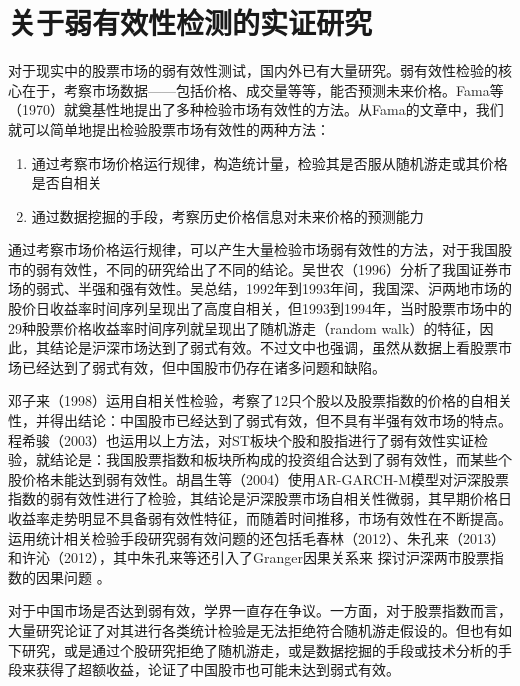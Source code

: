 \documentclass[twoside,longtitle]{LZUthesis}
\begin{document}
\section{关于弱有效性检测的实证研究}
对于现实中的股票市场的弱有效性测试，国内外已有大量研究。弱有效性检验的核心在于，考察市场数据——包括价格、成交量等等，能否预测未来价格。Fama等（1970）就奠基性地提出了多种检验市场有效性的方法\cite{Malkiel1970EFFICIENT}。从Fama的文章中，我们就可以简单地提出检验股票市场有效性的两种方法：
\begin{enumerate}
    \item 通过考察市场价格运行规律，构造统计量，检验其是否服从随机游走或其价格是否自相关
    \item 通过数据挖掘的手段，考察历史价格信息对未来价格的预测能力
\end{enumerate}

通过考察市场价格运行规律，可以产生大量检验市场弱有效性的方法，对于我国股市的弱有效性，不同的研究给出了不同的结论。吴世农（1996）分析了我国证券市场的弱式、半强和强有效性\cite{吴世农1996我国证券市场效率的分析}。吴总结，1992年到1993年间，我国深、沪两地市场的股价日收益率时间序列呈现出了高度自相关，但1993到1994年，当时股票市场中的29种股票价格收益率时间序列就呈现出了随机游走（random walk）的特征，因此，其结论是沪深市场达到了弱式有效。不过文中也强调，虽然从数据上看股票市场已经达到了弱式有效，但中国股市仍存在诸多问题和缺陷。

邓子来（1998）运用自相关性检验，考察了12只个股以及股票指数的价格的自相关性，并得出结论：中国股市已经达到了弱式有效，但不具有半强有效市场的特点\cite{邓子来市场有效理论及我国股票市场有效性的实证检验}。程希骏（2003）也运用以上方法，对ST板块个股和股指进行了弱有效性实证检验，就结论是：我国股票指数和板块所构成的投资组合达到了弱有效性，而某些个股价格未能达到弱有效性\cite{程希骏2003中国股市}。胡昌生等（2004）使用AR-GARCH-M模型对沪深股票指数的弱有效性进行了检验\cite{胡昌生2004中国股票市场有效性实证研究}，其结论是沪深股票市场自相关性微弱，其早期价格日收益率走势明显不具备弱有效性特征，而随着时间推移，市场有效性在不断提高。运用统计相关检验手段研究弱有效问题的还包括毛春林（2012）、朱孔来（2013）和许沁（2012），其中朱孔来等还引入了Granger因果关系来
探讨沪深两市股票指数的因果问题
\cite{毛春林2012有效市场理论与我国股票市场有效性分析}
\cite{朱孔来2013中国股票市场有效性的复合评价}
\cite{许沁2012中国股票市场弱有效性检验}。

对于中国市场是否达到弱有效，学界一直存在争议。一方面，对于股票指数而言，大量研究论证了对其进行各类统计检验是无法拒绝符合随机游走假设的。但也有如下研究，或是通过个股研究拒绝了随机游走，或是数据挖掘的手段或技术分析的手段来获得了超额收益，论证了中国股市也可能未达到弱式有效。
\end{document}
